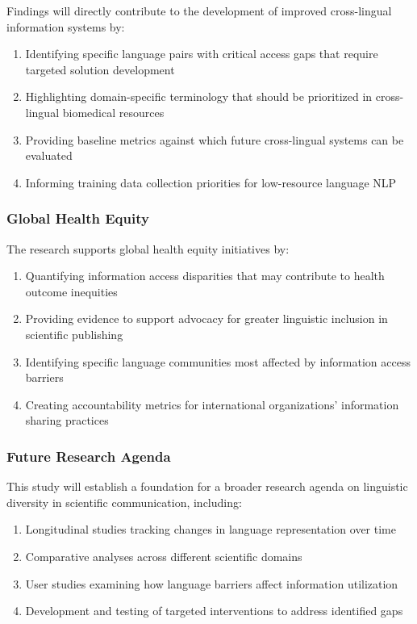 \documentclass[
]{article}
\providecommand{\tightlist}{%
  \setlength{\itemsep}{0pt}\setlength{\parskip}{0pt}}\usepackage{longtable,booktabs,array}
\begin{document}
Findings will directly contribute to the development of improved
cross-lingual information systems by:

\begin{enumerate}
\def\labelenumi{\arabic{enumi}.}
\tightlist
\item
  Identifying specific language pairs with critical access gaps that
  require targeted solution development
\item
  Highlighting domain-specific terminology that should be prioritized in
  cross-lingual biomedical resources
\item
  Providing baseline metrics against which future cross-lingual systems
  can be evaluated
\item
  Informing training data collection priorities for low-resource
  language NLP
\end{enumerate}

\subsubsection{Global Health Equity}\label{global-health-equity}

The research supports global health equity initiatives by:

\begin{enumerate}
\def\labelenumi{\arabic{enumi}.}
\tightlist
\item
  Quantifying information access disparities that may contribute to
  health outcome inequities
\item
  Providing evidence to support advocacy for greater linguistic
  inclusion in scientific publishing
\item
  Identifying specific language communities most affected by information
  access barriers
\item
  Creating accountability metrics for international organizations'
  information sharing practices
\end{enumerate}

\subsubsection{Future Research Agenda}\label{future-research-agenda}

This study will establish a foundation for a broader research agenda on
linguistic diversity in scientific communication, including:

\begin{enumerate}
\def\labelenumi{\arabic{enumi}.}
\tightlist
\item
  Longitudinal studies tracking changes in language representation over
  time
\item
  Comparative analyses across different scientific domains
\item
  User studies examining how language barriers affect information
  utilization
\item
  Development and testing of targeted interventions to address
  identified gaps
\end{enumerate}
\end{document}
